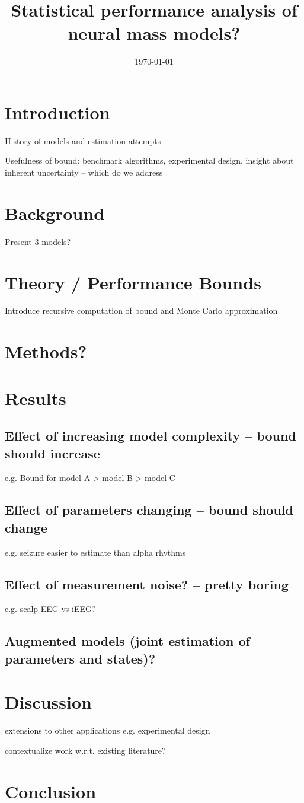 \documentclass{article}
\title{Statistical performance analysis of neural mass models?}
\date{\today}
\begin{document}
\section{Introduction}

History of models and estimation attempts

Usefulness of bound: benchmark algorithms, experimental design, insight about inherent uncertainty -- which do we address

\section{Background}

Present 3 models?

\section{Theory / Performance Bounds}

Introduce recursive computation of bound and Monte Carlo approximation

\section{Methods?}

\section{Results}

\subsection{Effect of increasing model complexity -- bound should increase}

e.g. Bound for model A > model B > model C

\subsection{Effect of parameters changing -- bound should change}

e.g. seizure easier to estimate than alpha rhythms

\subsection{Effect of measurement noise? -- pretty boring}

e.g. scalp EEG vs iEEG?

\subsection{Augmented models (joint estimation of parameters and states)?}

\section{Discussion}

extensions to other applications e.g. experimental design

contextualize work w.r.t. existing literature?

\section{Conclusion}


% 
% 
\end{document}
